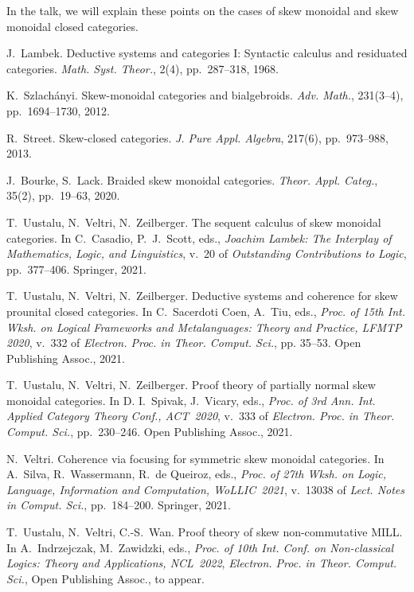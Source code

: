 \documentclass{article}
\begin{document}
In the talk, we will explain these points on the cases of skew
monoidal and skew monoidal closed categories.

\small

\begin{thebibliography}{99}

 J.~Lambek. Deductive systems and categories I: Syntactic
  calculus and residuated categories. \emph{Math. Syst. Theor.}, 2(4),
  pp.~287--318, 1968.

 K.~Szlach\'anyi. Skew-monoidal categories and
  bialgebroids. \emph{Adv. Math.}, 231(3--4), pp.~1694--1730, 2012.

 R.~Street. Skew-closed categories. \emph{J. Pure
Appl. Algebra}, 217(6), pp.~973--988, 2013.

 J.~Bourke, S.~Lack. Braided skew monoidal categories.
\emph{Theor. Appl. Categ.}, 35(2), pp.~19--63, 2020.

 T.~Uustalu, N.~Veltri, N.~Zeilberger. The sequent
  calculus of skew monoidal categories. In C.~Casadio, P.~J.~Scott,
  eds., \emph{Joachim Lambek: The Interplay of Mathematics, Logic, and
  Linguistics}, v.~20 of \emph{Outstanding Contributions to Logic},
  pp.~377--406. Springer, 2021.

 T.~Uustalu, N.~Veltri, N.~Zeilberger. Deductive
  systems and coherence for skew prounital closed categories. \linebreak In
  C.~Sacerdoti Coen, A.~Tiu, eds., \emph{Proc. of 15th Int. Wksh. on
    Logical Frameworks and Metalanguages: Theory and Practice, LFMTP
    2020}, v.~332 of \emph{Electron. Proc. in Theor. Comput. Sci.},
  pp. 35--53. Open Publishing Assoc., 2021.

 T.~Uustalu, N.~Veltri, N.~Zeilberger. Proof theory of
  partially normal skew monoidal categories. In D. I.~Spivak,
  J.~Vicary, eds., \emph{Proc. of 3rd Ann. Int. Applied Category
    Theory Conf., ACT~2020}, v.~333 of \emph{Electron. Proc. in
    Theor. Comput. Sci.}, pp.~230--246. Open Publishing Assoc., 2021.

 N.~Veltri. Coherence via focusing for symmetric skew
  monoidal categories. In A.~Silva, R.~Wassermann, R.~de Queiroz,
  eds., \emph{Proc. of 27th Wksh. on Logic, Language, Information and
    Computation, WoLLIC~2021}, v.~13038 of \emph{Lect. Notes in
    Comput. Sci.}, pp.~184--200. Springer, 2021.

 T.~Uustalu, N.~Veltri, C.-S.~Wan. Proof theory of skew
  non-commutative MILL. In A.~Indrzejczak, \linebreak M.~Zawidzki, eds.,
  \emph{Proc. of 10th Int. Conf. on Non-classical Logics: Theory and
    Applications, NCL~2022}, \emph{Electron. Proc. in
    Theor. Comput. Sci.}, Open Publishing Assoc., to appear.

\end{thebibliography}
\end{document}
